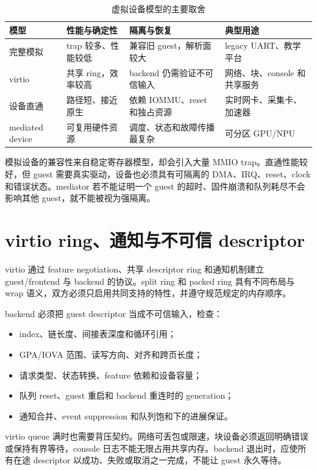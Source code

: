 \begin{table}[H]
  \centering
  \caption{虚拟设备模型的主要取舍}
  \begin{tabular}{p{28mm}p{34mm}p{35mm}p{39mm}}
    \hline
    模型 & 性能与确定性 & 隔离与恢复 & 典型用途 \\
    \hline
    完整模拟 & trap 较多、性能较低 & 兼容旧 guest，解析面较大 & legacy UART、教学平台 \\
    virtio & 共享 ring，效率较高 & backend 仍需验证不可信输入 & 网络、块、console 和共享服务 \\
    设备直通 & 路径短、接近原生 & 依赖 IOMMU、reset 和独占资源 & 实时网卡、采集卡、加速器 \\
    mediated device & 可复用硬件资源 & 调度、状态和故障传播最复杂 & 可分区 GPU/NPU \\
    \hline
  \end{tabular}
\end{table}

模拟设备的兼容性来自稳定寄存器模型，却会引入大量 MMIO trap。直通性能较好，但 guest 需要真实驱动，设备也必须具有可隔离的 DMA、IRQ、reset、clock 和错误状态。mediator 若不能证明一个 guest 的超时、固件崩溃和队列耗尽不会影响其他 guest，就不能被视为强隔离。

\section{virtio ring、通知与不可信 descriptor}

virtio 通过 feature negotiation、共享 descriptor ring 和通知机制建立 guest/frontend 与 backend 的协议。split ring 和 packed ring 具有不同布局与 wrap 语义，双方必须只启用共同支持的特性，并遵守规范规定的内存顺序\cite{virtio-spec}。

backend 必须把 guest descriptor 当成不可信输入，检查：

\begin{itemize}
  \item index、链长度、间接表深度和循环引用；
  \item GPA/IOVA 范围、读写方向、对齐和跨页长度；
  \item 请求类型、状态转换、feature 依赖和设备容量；
  \item 队列 reset、guest 重启和 backend 重连时的 generation；
  \item 通知合并、event suppression 和队列饱和下的进展保证。
\end{itemize}

virtio queue 满时也需要背压契约。网络可丢包或限速，块设备必须返回明确错误或保持有界等待，console 日志不能无限占用共享内存。backend 退出时，应使所有在途 descriptor 以成功、失败或取消之一完成，不能让 guest 永久等待。

